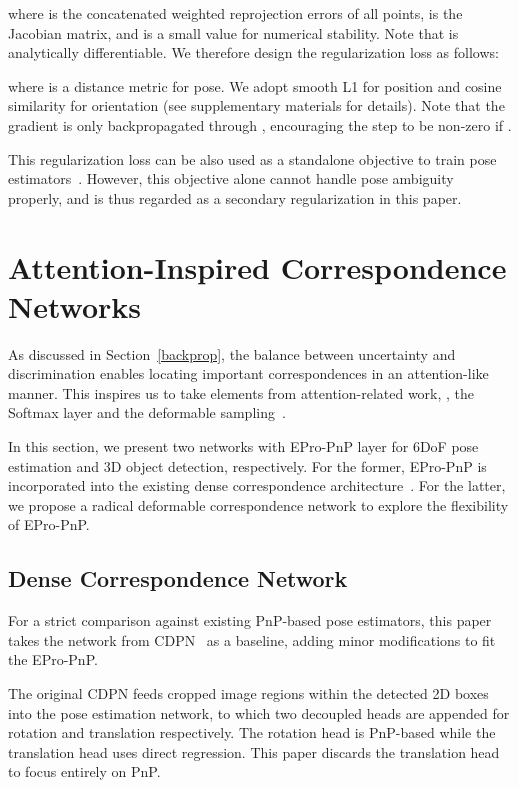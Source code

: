\documentclass[10pt,twocolumn,letterpaper]{article}
\begin{document}
where  is the concatenated weighted reprojection errors of all points,  is the Jacobian matrix, 
and  is a small value for numerical stability. Note that  is analytically differentiable. We therefore design the regularization loss as follows:

where  is a distance metric for pose. We adopt smooth L1 for position and cosine similarity for orientation (see supplementary materials for details). Note that the gradient is only backpropagated through , encouraging the step to be non-zero if . 

This regularization loss can be also used as a standalone objective to train pose estimators~\cite{repose}. However, this objective alone cannot handle pose ambiguity properly, and is thus regarded as a secondary regularization in this paper.

\section{Attention-Inspired Correspondence Networks}

As discussed in Section~\ref{backprop}, the balance between uncertainty and discrimination enables locating important correspondences in an attention-like manner.
This inspires us to take elements from attention-related work, \ie, the Softmax layer and the deformable sampling~\cite{deformabledetr}.

In this section, we present two networks with EPro-PnP layer for 6DoF pose estimation and 3D object detection, respectively. For the former, EPro-PnP is incorporated into the existing dense correspondence architecture~\cite{CDPN}. For the latter, we propose a radical deformable correspondence network to explore the flexibility of EPro-PnP.

\subsection{Dense Correspondence Network} \label{densecorrnet}
For a strict comparison against existing PnP-based pose estimators, this paper takes the network from CDPN~\cite{CDPN} as a baseline, adding minor modifications to fit the EPro-PnP.

The original CDPN feeds cropped image regions within the detected 2D boxes into the pose estimation network, to which two decoupled heads are appended for rotation and translation respectively.
The rotation head is PnP-based while the translation head uses direct regression. 
This paper discards the translation head to focus entirely on PnP. 
\end{document}
